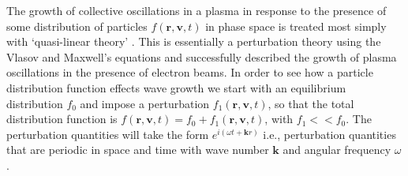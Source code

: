 The growth of collective oscillations in a plasma in response to the presence of some distribution of particles $f(\mathbf{r}, \mathbf{v}, t)$ in phase space is treated most simply with `quasi-linear theory' \citep{vedenov1963}. This is essentially a perturbation theory using the Vlasov and Maxwell's equations and successfully described the growth of plasma oscillations in the presence of electron beams. In order to see how a particle distribution function effects wave growth we start with an equilibrium distribution $f_0$ and impose a perturbation $f_1(\mathbf{r}, \mathbf{v}, t)$, so that the total distribution function is $f(\mathbf{r}, \mathbf{v}, t) = f_0 +f_1(\mathbf{r}, \mathbf{v}, t)$, with $f_1<<f_0$.  The perturbation quantities will take the form $e^{i(\omega t + \mathbf{k}r)}$ i.e., perturbation quantities that are periodic in space and time with wave number $\mathbf{k}$ and angular frequency $\omega$.

